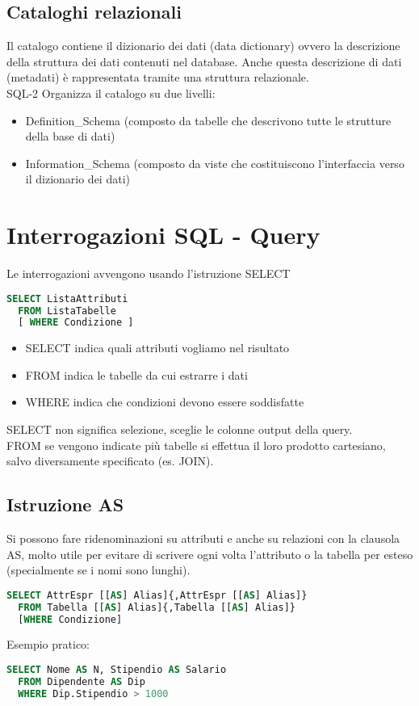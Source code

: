 \subsection{Cataloghi relazionali}
Il catalogo contiene il dizionario dei dati (data dictionary) ovvero la descrizione
della struttura dei dati contenuti nel database. Anche questa descrizione di dati (metadati)
è rappresentata tramite una struttura relazionale.\\
SQL-2 Organizza il catalogo su due livelli:
\begin{itemize}
  \item Definition\_Schema (composto da tabelle che descrivono tutte le strutture della
  base di dati)
  \item Information\_Schema (composto da viste che costituiscono l'interfaccia verso 
  il dizionario dei dati)
\end{itemize}

\section{Interrogazioni SQL - Query}
Le interrogazioni avvengono usando l'istruzione SELECT
\begin{lstlisting}[language=SQL]
  SELECT ListaAttributi
  FROM ListaTabelle
  [ WHERE Condizione ]
\end{lstlisting}
\begin{itemize}
  \item SELECT indica quali attributi vogliamo nel risultato
  \item FROM indica le tabelle da cui estrarre i dati
  \item WHERE indica che condizioni devono essere soddisfatte
\end{itemize}
SELECT non significa selezione, sceglie le colonne output della query.\\
FROM se vengono indicate più tabelle si effettua il loro prodotto cartesiano, 
salvo diversamente specificato (es. JOIN).\\
\subsection{Istruzione AS}
Si possono fare ridenominazioni su attributi e anche su relazioni con la clausola AS, 
molto utile per evitare di scrivere ogni volta l'attributo o la tabella per esteso
(specialmente se i nomi sono lunghi).\\
\begin{lstlisting}[language=SQL]
  SELECT AttrEspr [[AS] Alias]{,AttrEspr [[AS] Alias]}
  FROM Tabella [[AS] Alias]{,Tabella [[AS] Alias]}
  [WHERE Condizione]
\end{lstlisting}
Esempio pratico:
\begin{lstlisting}[language=SQL]
  SELECT Nome AS N, Stipendio AS Salario
  FROM Dipendente AS Dip
  WHERE Dip.Stipendio > 1000
\end{lstlisting}
